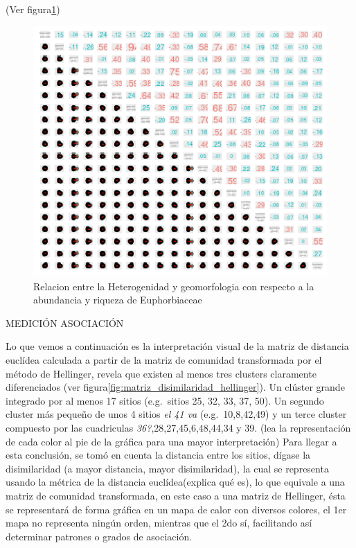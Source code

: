 \documentclass[11pt,]{article}
\begin{document}
(Ver figura\ref{fig:het_geomorf_abun_riqu})

\begin{figure}
\centering
\includegraphics{het_geomorf_abun_riqu.png}
\caption{\label{fig:het_geomorf_abun_riqu} Relacion entre la
Heterogenidad y geomorfologia con respecto a la abundancia y riqueza de
Euphorbiaceae}
\end{figure}

MEDICIÓN ASOCIACIÓN

Lo que vemos a continuación es la interpretación visual de la matriz de
distancia euclídea calculada a partir de la matriz de comunidad
transformada por el método de Hellinger, revela que existen al menos
tres clusters claramente diferenciados (ver
figura\ref{fig:matriz_disimilaridad_hellinger}). Un clúster grande
integrado por al menos 17 sitios (e.g.~sitios 25, 32, 33, 37, 50). Un
segundo cluster más pequeño de unos 4 sitios \emph{el 41 va}
(e.g.~10,8,42,49) y un terce cluster compuesto por las cuadriculas
\emph{36?},28,27,45,6,48,44,34 y 39. (lea la representación de cada
color al pie de la gráfica para una mayor interpretación) Para llegar a
esta conclusión, se tomó en cuenta la distancia entre los sitios, dígase
la disimilaridad (a mayor distancia, mayor disimilaridad), la cual se
representa usando la métrica de la distancia euclídea(explica qué es),
lo que equivale a una matriz de comunidad transformada, en este caso a
una matriz de Hellinger, ésta se representará de forma gráfica en un
mapa de calor con diversos colores, el 1er mapa no representa ningún
orden, mientras que el 2do sí, facilitando así determinar patrones o
grados de asociación.
\end{document}
